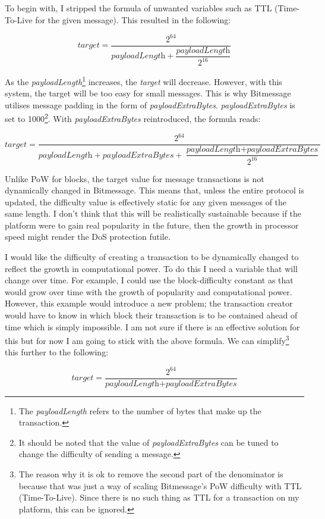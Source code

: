 \documentclass{article}
\begin{document}
To begin with, I stripped the formula of unwanted variables such as TTL (Time-To-Live for the given message). This resulted in the following:
\begin{center}
\[\textit{target} = \dfrac{2^{64}}{\textit{payloadLength} + \dfrac{\textit{payloadLength}}{2^{16}}}\]
\end{center}

As the \textit{payloadLength}\footnote{The \textit{payloadLength} refers to the number of bytes that make up the transaction.} increases, the \textit{target} will decrease. However, with this system, the target will be too easy for small messages. This is why Bitmessage utilises message padding in the form of \textit{payloadExtraBytes}. \textit{payloadExtraBytes} is set to 1000\footnote{It should be noted that the value of \textit{payloadExtraBytes} can be tuned to change the difficulty of sending a message. }. With \textit{payloadExtraBytes} reintroduced, the formula reads:
\begin{center}
\[\textit{target} = \dfrac{2^{64}}{\textit{payloadLength} + \textit{payloadExtraBytes}  + \dfrac{\textit{payloadLength} + \textit{payloadExtraBytes}}{2^{16}}}\]
\end{center}

Unlike PoW for blocks, the target value for message transactions is not dynamically changed in Bitmessage. This means that, unless the entire protocol is updated, the difficulty value is effectively static for any given messages of the same length. I don't think that this will be realistically sustainable because if the platform were to gain real popularity in the future, then the growth in processor speed might render the DoS protection futile.

I would like the difficulty of creating a transaction to be dynamically changed to reflect the growth in computational power. To do this I need a variable that will change over time. For example, I could use the block-difficulty constant as that would grow over time with the growth of popularity and computational power. However, this example would introduce a new problem; the transaction creator would have to know in which block their transaction is to be contained ahead of time which is simply impossible. I am not sure if there is an effective solution for this but for now I am going to stick with the above formula. We can simplify\footnote{The reason why it is ok to remove the second part of the denominator is because that was just a way of scaling Bitmessage's PoW difficulty with TTL (Time-To-Live). Since there is no such thing as TTL for a transaction on my platform, this can be ignored.} this further to the following:
\begin{center}
\[\textit{target} = \dfrac{2^{64}}{\textit{payloadLength} + \textit{payloadExtraBytes}}\]
\end{center}
\end{document}
